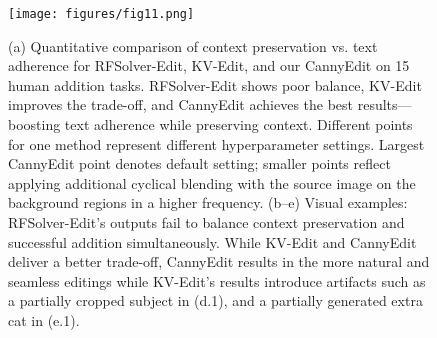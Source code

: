 \documentclass{article}
\begin{document}
\begin{figure}[t]
    \centering
    \texttt{[image: figures/fig11.png]}
  \caption{(a) Quantitative comparison of context preservation vs. text adherence for RFSolver-Edit, KV-Edit, and our CannyEdit on 15 human addition tasks. RFSolver-Edit shows poor balance, KV-Edit improves the trade-off, and CannyEdit achieves the best results—boosting text adherence while preserving context. Different points for one method represent different hyperparameter settings. Largest CannyEdit point denotes default setting; smaller points reflect applying additional cyclical blending with the source image on the background regions in a higher frequency. (b–e) Visual examples: RFSolver-Edit's outputs fail to balance context preservation and successful addition simultaneously. While KV-Edit and CannyEdit deliver a better trade-off, CannyEdit results in the more natural and seamless editings while KV-Edit's results introduce artifacts such as a {partially cropped subject} in (d.1), and {a partially generated extra cat} in (e.1).}
    \label{fig2}
\end{figure}


\end{document}
